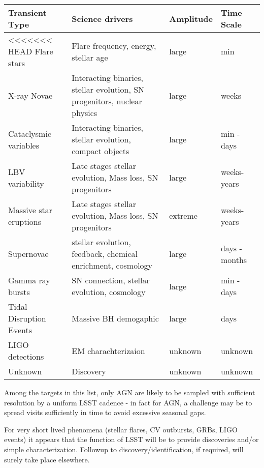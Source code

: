 \begin{center}
\begin{tabular}{| p{3cm} | p{8cm} | l | l |}
\hline Transient Type & Science drivers & Amplitude & Time Scale\\
\hline
<<<<<<< HEAD
Flare stars & Flare frequency, energy, stellar age & large & min \\

X-ray Novae & Interacting binaries, stellar evolution, SN progenitors, nuclear physics & large & weeks \\

Cataclysmic variables  & Interacting binaries, stellar evolution, compact objects & large & min - days\\

LBV variability & Late stages stellar evolution, Mass loss, SN progenitors & large & weeks-years\\

Massive star eruptions &  Late stages stellar evolution, Mass loss, SN progenitors & extreme &  weeks-years\\

Supernovae & stellar evolution, feedback, chemical enrichment, cosmology & large & days - months \\

Gamma ray bursts & SN connection, stellar evolution, cosmology & large & min - days\\

Tidal Disruption Events & Massive BH demogaphic  & large & days\\

LIGO detections &  EM charachterizaion & unknown & unknown\\

Unknown  & Discovery & unknown & unknown\\

 \hline \end{tabular}
 \end{center}

Among the targets in this list, only AGN are likely to be sampled with sufficient resolution by a uniform LSST cadence - in fact for AGN, a challenge may be to spread visits sufficiently in time to avoid excessive seasonal gaps.

For very short lived phenomena (stellar flares, CV outbursts, GRBs, LIGO events) it appears that the function of LSST will be to provide discoveries and/or simple characterization.  Followup to discovery/identification, if required, will surely take place elsewhere.

